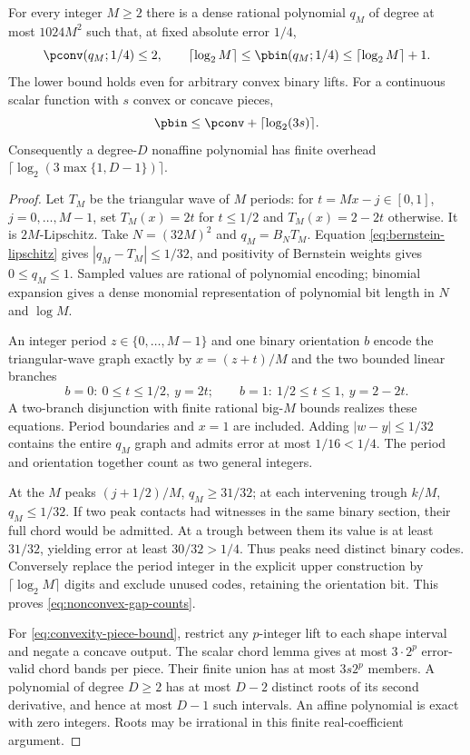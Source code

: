 \begin{theorem}
\label{thm:nonconvex-gap}
For every integer $M\ge2$ there is a dense rational polynomial $q_M$
of degree at most $1024M^2$ such that, at fixed absolute error $1/4$,
\begin{equation}\label{eq:nonconvex-gap-counts}
 \pconv(q_M;1/4)\le2,\qquad
 \lceil\log_2M\rceil\le\pbin(q_M;1/4)
 \le\lceil\log_2M\rceil+1.
\end{equation}
The lower bound holds even for arbitrary convex binary lifts.
For a continuous scalar function with $s$ convex or concave pieces,
\begin{equation}\label{eq:convexity-piece-bound}
 \pbin\le\pconv+\lceil\log_2(3s)\rceil.
\end{equation}
Consequently a degree-$D$ nonaffine polynomial has finite overhead
$\lceil\log_2(3\max\{1,D-1\})\rceil$.
\end{theorem}
\begin{proof}
Let $T_M$ be the triangular wave of $M$ periods: for
$t=Mx-j\in[0,1]$, $j=0,\ldots,M-1$, set
$T_M(x)=2t$ for $t\le1/2$ and $T_M(x)=2-2t$ otherwise.
It is $2M$-Lipschitz. Take $N=(32M)^2$ and $q_M=B_NT_M$.
Equation \eqref{eq:bernstein-lipschitz} gives
$|q_M-T_M|\le1/32$, and positivity of Bernstein weights gives
$0\le q_M\le1$. Sampled values are rational of polynomial encoding;
binomial expansion gives a dense monomial representation of polynomial
bit length in $N$ and $\log M$.

An integer period $z\in\{0,\ldots,M-1\}$ and one binary orientation
$b$ encode the triangular-wave graph exactly by $x=(z+t)/M$ and the
two bounded linear branches
\[
 b=0:\ 0\le t\le1/2,\ y=2t;
 \qquad b=1:\ 1/2\le t\le1,\ y=2-2t.
\]
A two-branch disjunction with finite rational big-$M$ bounds realizes
these equations. Period boundaries and $x=1$ are included. Adding
$|w-y|\le1/32$ contains the entire $q_M$ graph and admits error
at most $1/16<1/4$. The period and orientation together count as two
general integers.

At the $M$ peaks $(j+1/2)/M$, $q_M\ge31/32$; at each intervening
trough $k/M$, $q_M\le1/32$. If two peak contacts had witnesses in
the same binary section, their full chord would be admitted. At a
trough between them its value is at least $31/32$, yielding error
at least $30/32>1/4$. Thus peaks need distinct binary codes.
Conversely replace the period integer in the explicit upper construction
by $\lceil\log_2M\rceil$ digits and exclude unused codes, retaining
the orientation bit. This proves \eqref{eq:nonconvex-gap-counts}.

For \eqref{eq:convexity-piece-bound}, restrict any $p$-integer lift
to each shape interval and negate a concave output. The scalar chord
lemma gives at most $3\cdot2^p$ error-valid chord bands per piece.
Their finite union has at most $3s2^p$ members. A polynomial of
degree $D\ge2$ has at most $D-2$ distinct roots of its second
derivative, and hence at most $D-1$ such intervals. An affine
polynomial is exact with zero integers. Roots may be irrational in this
finite real-coefficient argument.
\end{proof}

